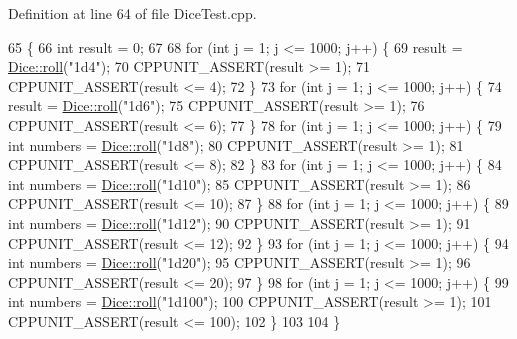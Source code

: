 Definition at line 64 of file Dice\+Test.\+cpp.


\begin{DoxyCode}
65 \{
66     \textcolor{keywordtype}{int} result = 0;
67 
68     \textcolor{keywordflow}{for} (\textcolor{keywordtype}{int} j = 1; j <= 1000; j++) \{
69         result = \hyperlink{class_dice_a7428dd940e0af226820414ca07147771}{Dice::roll}(\textcolor{stringliteral}{"1d4"});
70         CPPUNIT\_ASSERT(result >= 1);
71         CPPUNIT\_ASSERT(result <= 4);
72     \}
73     \textcolor{keywordflow}{for} (\textcolor{keywordtype}{int} j = 1; j <= 1000; j++) \{
74         result = \hyperlink{class_dice_a7428dd940e0af226820414ca07147771}{Dice::roll}(\textcolor{stringliteral}{"1d6"});
75         CPPUNIT\_ASSERT(result >= 1);
76         CPPUNIT\_ASSERT(result <= 6);
77     \}
78     \textcolor{keywordflow}{for} (\textcolor{keywordtype}{int} j = 1; j <= 1000; j++) \{
79         \textcolor{keywordtype}{int} numbers = \hyperlink{class_dice_a7428dd940e0af226820414ca07147771}{Dice::roll}(\textcolor{stringliteral}{"1d8"});
80         CPPUNIT\_ASSERT(result >= 1);
81         CPPUNIT\_ASSERT(result <= 8);
82     \}
83     \textcolor{keywordflow}{for} (\textcolor{keywordtype}{int} j = 1; j <= 1000; j++) \{
84         \textcolor{keywordtype}{int} numbers = \hyperlink{class_dice_a7428dd940e0af226820414ca07147771}{Dice::roll}(\textcolor{stringliteral}{"1d10"});
85         CPPUNIT\_ASSERT(result >= 1);
86         CPPUNIT\_ASSERT(result <= 10);
87     \}
88     \textcolor{keywordflow}{for} (\textcolor{keywordtype}{int} j = 1; j <= 1000; j++) \{
89         \textcolor{keywordtype}{int} numbers = \hyperlink{class_dice_a7428dd940e0af226820414ca07147771}{Dice::roll}(\textcolor{stringliteral}{"1d12"});
90         CPPUNIT\_ASSERT(result >= 1);
91         CPPUNIT\_ASSERT(result <= 12);
92     \}
93     \textcolor{keywordflow}{for} (\textcolor{keywordtype}{int} j = 1; j <= 1000; j++) \{
94         \textcolor{keywordtype}{int} numbers = \hyperlink{class_dice_a7428dd940e0af226820414ca07147771}{Dice::roll}(\textcolor{stringliteral}{"1d20"});
95         CPPUNIT\_ASSERT(result >= 1);
96         CPPUNIT\_ASSERT(result <= 20);
97     \}
98     \textcolor{keywordflow}{for} (\textcolor{keywordtype}{int} j = 1; j <= 1000; j++) \{
99         \textcolor{keywordtype}{int} numbers = \hyperlink{class_dice_a7428dd940e0af226820414ca07147771}{Dice::roll}(\textcolor{stringliteral}{"1d100"});
100         CPPUNIT\_ASSERT(result >= 1);
101         CPPUNIT\_ASSERT(result <= 100);
102     \}
103 
104 \}
\end{DoxyCode}
\hypertarget{class_dice_test_a3e9f2421e914d4f18de2327828345860}{}
